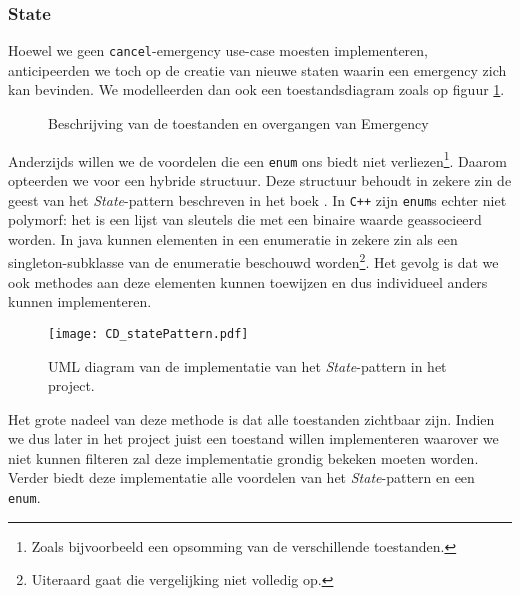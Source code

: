 \subsubsection{State}
Hoewel we geen \verb+cancel+-emergency use-case moesten implementeren, anticipeerden we toch op de creatie van nieuwe staten waarin een emergency zich kan bevinden. We modelleerden dan ook een toestandsdiagram zoals op figuur \ref{fig:stateDiagramEmergency}.
\begin{figure}[h!]
\centering
\begin{tikzpicture}
\end{tikzpicture}
\caption{Beschrijving van de toestanden en overgangen van Emergency}
\label{fig:stateDiagramEmergency}
\end{figure}
Anderzijds willen we de voordelen die een \verb+enum+ ons biedt niet verliezen\footnote{Zoals bijvoorbeeld een opsomming van de verschillende toestanden.}. Daarom opteerden we voor een hybride structuur. Deze structuur behoudt in zekere zin de geest van het \textit{State}-pattern beschreven in het boek \cite{book:designpatterns}. In \verb#C++# zijn \verb+enum+s echter niet polymorf: het is een lijst van sleutels die met een binaire waarde geassocieerd worden. In java kunnen elementen in een enumeratie in zekere zin als een singleton-subklasse van de enumeratie beschouwd worden\footnote{Uiteraard gaat die vergelijking niet volledig op.}. Het gevolg is dat we ook methodes aan deze elementen kunnen toewijzen en dus individueel anders kunnen implementeren.
\begin{figure}[h!]
\texttt{[image: CD\_statePattern.pdf]}
\caption{UML diagram van de implementatie van het \textit{State}-pattern in het project.}
\label{fig:statePattern}
\end{figure}
Het grote nadeel van deze methode is dat alle toestanden zichtbaar zijn. Indien we dus later in het project juist een toestand willen implementeren waarover we niet kunnen filteren zal deze implementatie grondig bekeken moeten worden. Verder biedt deze implementatie alle voordelen van het \textit{State}-pattern en een \verb+enum+.
